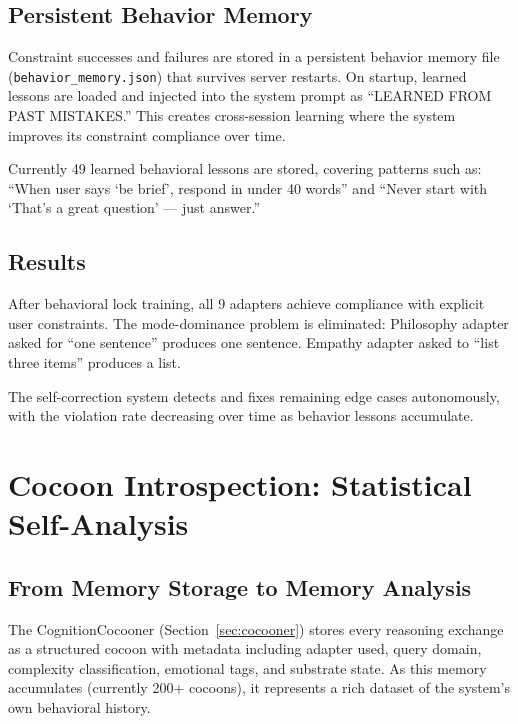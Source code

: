 \subsection{Persistent Behavior Memory}

Constraint successes and failures are stored in a persistent behavior memory
file (\texttt{behavior\_memory.json}) that survives server restarts. On
startup, learned lessons are loaded and injected into the system prompt as
``LEARNED FROM PAST MISTAKES.'' This creates cross-session learning where
the system improves its constraint compliance over time.

Currently 49 learned behavioral lessons are stored, covering patterns such
as: ``When user says `be brief', respond in under 40 words'' and ``Never
start with `That's a great question' --- just answer.''

\subsection{Results}

After behavioral lock training, all 9 adapters achieve compliance with
explicit user constraints. The mode-dominance problem is eliminated:
Philosophy adapter asked for ``one sentence'' produces one sentence.
Empathy adapter asked to ``list three items'' produces a list.

The self-correction system detects and fixes remaining edge cases
autonomously, with the violation rate decreasing over time as behavior
lessons accumulate.



\section{Cocoon Introspection: Statistical Self-Analysis}
\label{sec:introspection}

\subsection{From Memory Storage to Memory Analysis}

The CognitionCocooner (Section~\ref{sec:cocooner}) stores every reasoning
exchange as a structured cocoon with metadata including adapter used, query
domain, complexity classification, emotional tags, and substrate state. As
this memory accumulates (currently 200+ cocoons), it represents a rich
dataset of the system's own behavioral history.

